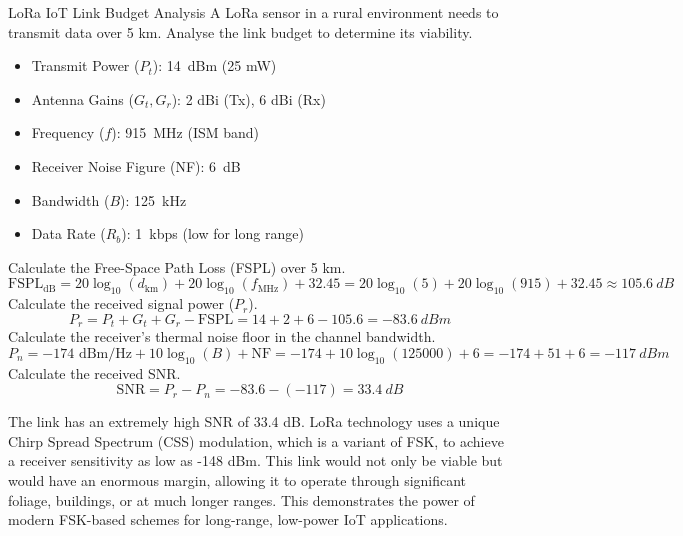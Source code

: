 \begin{workedexample}{LoRa IoT Link Budget Analysis}
     A LoRa sensor in a rural environment needs to transmit data over 5 km. Analyse the link budget to determine its viability.
    \begin{itemize}
        \item Transmit Power ($P_t$): \qty{14}{dBm} (25 mW)
        \item Antenna Gains ($G_t, G_r$): 2 dBi (Tx), 6 dBi (Rx)
        \item Frequency ($f$): \qty{915}{MHz} (ISM band)
        \item Receiver Noise Figure (NF): \qty{6}{dB}
        \item Bandwidth ($B$): \qty{125}{kHz}
        \item Data Rate ($R_b$): \qty{1}{kbps} (low for long range)
    \end{itemize}
    \begin{derivationsteps}
        \step Calculate the Free-Space Path Loss (FSPL) over 5 km.
        \[ \text{FSPL}_{\text{dB}} = 20\log_{10}(d_{\text{km}}) + 20\log_{10}(f_{\text{MHz}}) + 32.45 = 20\log_{10}(5) + 20\log_{10}(915) + 32.45 \approx \qty{105.6}{dB} \]
        \step Calculate the received signal power ($P_r$).
        \[ P_r = P_t + G_t + G_r - \text{FSPL} = 14 + 2 + 6 - 105.6 = \qty{-83.6}{dBm} \]
        \step Calculate the receiver's thermal noise floor in the channel bandwidth.
        \[ P_n = -174 \text{ dBm/Hz} + 10\log_{10}(B) + \text{NF} = -174 + 10\log_{10}(125000) + 6 = -174 + 51 + 6 = \qty{-117}{dBm} \]
        \step Calculate the received SNR.
        \[ \text{SNR} = P_r - P_n = -83.6 - (-117) = \qty{33.4}{dB} \]
    \end{derivationsteps}
     The link has an extremely high SNR of 33.4 dB. LoRa technology uses a unique Chirp Spread Spectrum (CSS) modulation, which is a variant of FSK, to achieve a receiver sensitivity as low as -148 dBm. This link would not only be viable but would have an enormous margin, allowing it to operate through significant foliage, buildings, or at much longer ranges. This demonstrates the power of modern FSK-based schemes for long-range, low-power IoT applications.
\end{workedexample}

